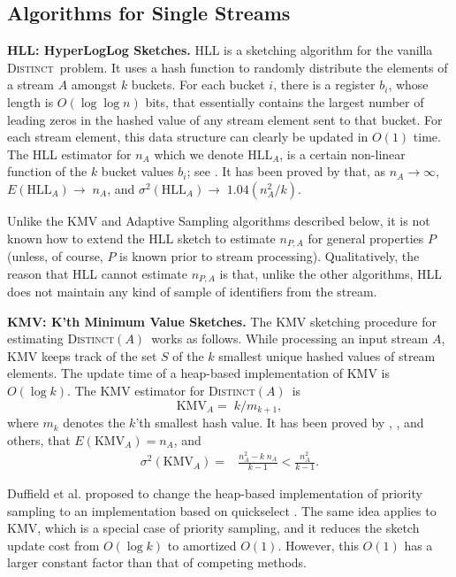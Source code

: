 \documentclass{article}
\newcommand{\romHLL}{\mathrm{HLL}}
\newcommand{\romKMV}{\mathrm{KMV}}
\newcommand{\distinct}{\textsc{Distinct}}
\newcommand{\distinctA}{\textsc{Distinct}$(A)$}
\begin{document}
\subsection{Algorithms for Single Streams}
\noindent \textbf{HLL: HyperLogLog Sketches.}\label{subsubHLL}
HLL is a sketching algorithm for the vanilla \distinct\ problem. It uses a hash function to randomly distribute the elements of a stream $A$ amongst $k$ buckets.
For each bucket $i$, there is a register $b_i$, whose length is $O(\log \log n)$ bits, that essentially
contains the largest number of leading zeros in the hashed value of any stream element sent to that bucket.
For each stream element, this data structure can clearly be updated in $O(1)$ time.
The HLL estimator for $n_A$ which we denote $\romHLL_A $, is a certain non-linear function of the $k$ bucket values $b_i$; 
see \cite{flajolet2008hyperloglog}. It has been proved by \cite{flajolet2008hyperloglog} that, as $n_A \rightarrow \infty$,
$E(\romHLL_A) \rightarrow\; n_A$, and $\sigma^2(\romHLL_A) \rightarrow\; 1.04 (n_A^2/k)$. 

Unlike the KMV and Adaptive Sampling algorithms described below, it is not known how to extend the HLL sketch to estimate $n_{P, A}$ for general properties $P$ (unless, of course, $P$ is known prior to stream
processing). 
Qualitatively, the reason that HLL cannot estimate $n_{P, A}$
is that, unlike the other algorithms, HLL does not maintain any kind of sample of identifiers from the stream.

\medskip
\noindent \textbf{KMV: K'th Minimum Value Sketches.}\label{subsubBKMV}
\label{sec:KMV}
The KMV sketching procedure for estimating \distinctA\ works as follows. While processing an input stream $A$, KMV keeps track of the set $S$ of the $k$ smallest unique hashed values of stream elements.
The update time of a heap-based implementation of KMV is $O(\log k)$.
The KMV estimator for \distinctA\ is
\begin{equation} \label{eq:kmv} \romKMV_A = \; k / m_{k+1},\end{equation} where $m_k$ denotes the $k$'th smallest hash value.
It has been proved by \cite{beyer2009distinct}, \cite{giroire2009order}, and others, that $E(\romKMV_A) = n_A$, and
\begin{align}
\sigma^2(\romKMV_A) = & \frac{n_A^2- k \; n_A}{k-1} < \frac{n_A^2}{k-1}.
\end{align}

Duffield et al. \cite{DuffieldLT07} proposed to change 
the heap-based implementation of priority sampling
to an implementation based on quickselect \cite{quickselect61}. 
The same idea applies to KMV, which is a special case of priority sampling,
and it reduces the sketch update cost from $O(\log k)$ to amortized $O(1)$. 
However, this $O(1)$ has a larger constant factor than
that of competing methods.
\end{document}
